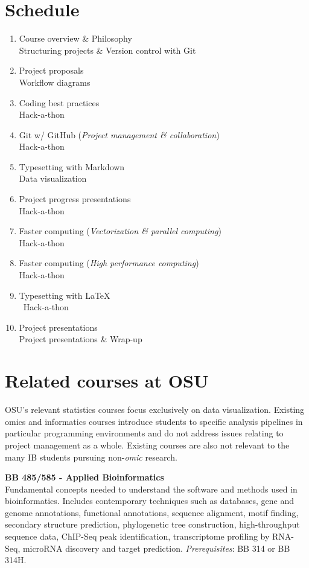 \documentclass[10pt]{article}
\begin{document}
\section*{Schedule}
\begin{enumerate}[label=\bfseries Week \arabic*:,leftmargin=*,labelindent=1em]
	\itemsep0em
	\item Course overview \& Philosophy\\
				Structuring projects \& Version control with Git
	\item Project proposals\\
				Workflow diagrams
	\item Coding best practices \\
				Hack-a-thon
	\item Git w/ GitHub (\emph{Project management \& collaboration})\\
				Hack-a-thon
	\item Typesetting with Markdown\\
				Data visualization
	\item Project progress presentations\\
				Hack-a-thon
	\item Faster computing (\emph{Vectorization \& parallel computing})\\
				Hack-a-thon
	\item Faster computing (\emph{High performance computing})\\
				Hack-a-thon
	\item Typesetting with \LaTeX\\\
				Hack-a-thon
	\item Project presentations\\
				Project presentations \& Wrap-up
\end{enumerate}


\section*{Related courses at OSU}
OSU's relevant statistics courses focus exclusively on data visualization.
Existing omics and informatics courses introduce students to specific analysis 
pipelines in particular programming environments and do not address issues relating to project 
management as a whole.
Existing courses are also not relevant to the many IB students pursuing non-\emph{omic} research.

\vspace{1pc}
\noindent
\textbf{BB 485/585 - Applied Bioinformatics}\\
Fundamental concepts needed to understand the software and methods used in bioinformatics. Includes 
contemporary techniques such as databases, gene and genome annotations, functional annotations, 
sequence alignment, motif finding, secondary structure prediction, phylogenetic tree construction, 
high-throughput sequence data, ChIP-Seq peak identification, transcriptome profiling by RNA-Seq, 
microRNA discovery and target prediction.  \emph{Prerequisites}: BB 314 or BB 314H.
\end{document}
